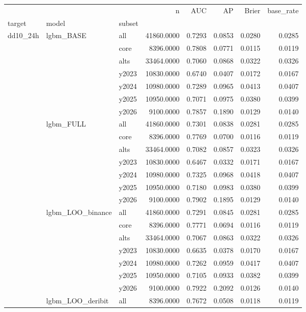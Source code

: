 \begin{tabular}{lllrrrrr}
\toprule
 &  &  & n & AUC & AP & Brier & base_rate \\
target & model & subset &  &  &  &  &  \\
\midrule
\multirow[t]{70}{*}{dd10_24h} & \multirow[t]{7}{*}{lgbm_BASE} & all & 41860.0000 & 0.7293 & 0.0853 & 0.0280 & 0.0285 \\
 &  & core & 8396.0000 & 0.7808 & 0.0771 & 0.0115 & 0.0119 \\
 &  & alts & 33464.0000 & 0.7060 & 0.0868 & 0.0322 & 0.0326 \\
 &  & y2023 & 10830.0000 & 0.6740 & 0.0407 & 0.0172 & 0.0167 \\
 &  & y2024 & 10980.0000 & 0.7289 & 0.0965 & 0.0413 & 0.0407 \\
 &  & y2025 & 10950.0000 & 0.7071 & 0.0975 & 0.0380 & 0.0399 \\
 &  & y2026 & 9100.0000 & 0.7857 & 0.1890 & 0.0129 & 0.0140 \\
\cline{2-8}
 & \multirow[t]{7}{*}{lgbm_FULL} & all & 41860.0000 & 0.7301 & 0.0838 & 0.0281 & 0.0285 \\
 &  & core & 8396.0000 & 0.7769 & 0.0700 & 0.0116 & 0.0119 \\
 &  & alts & 33464.0000 & 0.7082 & 0.0857 & 0.0323 & 0.0326 \\
 &  & y2023 & 10830.0000 & 0.6467 & 0.0332 & 0.0171 & 0.0167 \\
 &  & y2024 & 10980.0000 & 0.7325 & 0.0968 & 0.0418 & 0.0407 \\
 &  & y2025 & 10950.0000 & 0.7180 & 0.0983 & 0.0380 & 0.0399 \\
 &  & y2026 & 9100.0000 & 0.7902 & 0.1895 & 0.0129 & 0.0140 \\
\cline{2-8}
 & \multirow[t]{7}{*}{lgbm_LOO_binance} & all & 41860.0000 & 0.7291 & 0.0845 & 0.0281 & 0.0285 \\
 &  & core & 8396.0000 & 0.7771 & 0.0694 & 0.0116 & 0.0119 \\
 &  & alts & 33464.0000 & 0.7067 & 0.0863 & 0.0322 & 0.0326 \\
 &  & y2023 & 10830.0000 & 0.6635 & 0.0378 & 0.0170 & 0.0167 \\
 &  & y2024 & 10980.0000 & 0.7262 & 0.0959 & 0.0417 & 0.0407 \\
 &  & y2025 & 10950.0000 & 0.7105 & 0.0933 & 0.0382 & 0.0399 \\
 &  & y2026 & 9100.0000 & 0.7922 & 0.2092 & 0.0126 & 0.0140 \\
\cline{2-8}
 & \multirow[t]{7}{*}{lgbm_LOO_deribit} & all & 8396.0000 & 0.7672 & 0.0508 & 0.0118 & 0.0119 \\

\end{tabular}
